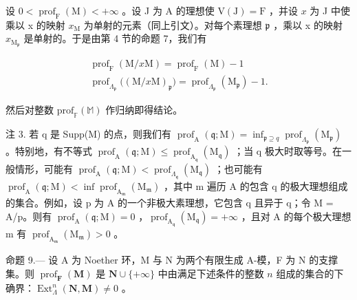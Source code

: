 设 \(0 < \operatorname{prof}_{\mathrm{F}}(\mathrm{M}) < +\infty\) 。设 J 为 A 的理想使 \(\mathrm{V}(\mathrm{J}) = \mathrm{F}\) ，并设 \(x\) 为 J 中使乘以 x 的映射 \(x_{\mathrm{M}}\) 为单射的元素（同上引文）。对每个素理想 \(\mathfrak{p}\) ，乘以 x 的映射 \(x_{\mathrm{M}_{\mathfrak{p}}}\) 是单射的。于是由第 4 节的命题 7，我们有

\[
\begin{array}{c} \operatorname{prof} _ {\mathrm{F}} (\mathrm{M} / x \mathrm{M}) = \operatorname{prof} _ {\mathrm{F}} (\mathrm{M}) - 1 \\ \operatorname{prof} _ {\Lambda_ {\mathfrak {p}}} \big ((\mathrm{M} / x \mathrm{M}) _ {\mathfrak {p}} \big) = \operatorname{prof} _ {\Lambda_ {\mathfrak {p}}} (\mathrm{M} _ {\mathfrak {p}}) - 1. \end{array}
\]

然后对整数 \(\mathrm{prof}_{\mathbb{F}}(\mathbb{M})\) 作归纳即得结论。

注 3. 若 q 是 Supp(M) 的点，则我们有 \(\operatorname{prof}_{\mathrm{A}}(\mathfrak{q};\mathrm{M}) = \inf_{\mathfrak{p}\supseteq q} \operatorname{prof}_{\Lambda_{\mathfrak{p}}}(\mathrm{M}_{\mathfrak{p}})\) 。特别地，有不等式 \(\operatorname{prof}_{\mathrm{A}}(\mathfrak{q};\mathrm{M}) \leqslant \operatorname{prof}_{\mathrm{A}_{\mathfrak{q}}}(\mathrm{M}_{\mathfrak{q}})\) ；当 q 极大时取等号。在一般情形，可能有 \(\operatorname{prof}_{\mathrm{A}}(\mathfrak{q};\mathrm{M}) < \operatorname{prof}_{\Lambda_{\mathfrak{q}}}(\mathrm{M}_{\mathfrak{q}})\) ；也可能有 \(\operatorname{prof}_{\mathrm{A}}(\mathfrak{q};\mathrm{M}) < \inf \operatorname{prof}_{\mathrm{A}_{\mathfrak{m}}}(\mathrm{M}_{\mathfrak{m}})\) ，其中 m 遍历 A 的包含 q 的极大理想组成的集合。例如，设 p 为 A 的一个非极大素理想，它包含 q 且异于 q；令 M = A/p。则有 \(\operatorname{prof}_{\mathrm{A}}(\mathfrak{q};\mathrm{M}) = 0\) ，\(\operatorname{prof}_{\mathrm{A}_{\mathfrak{q}}}(\mathrm{M}_{\mathfrak{q}}) = +\infty\) ，且对 A 的每个极大理想 m 有 \(\operatorname{prof}_{\mathrm{A}_{\mathfrak{m}}}(\mathrm{M}_{\mathfrak{m}}) > 0\) 。

命题 9.--- 设 A 为 Noether 环，M 与 N 为两个有限生成 A-模，F 为 N 的支撑集。则 \(\operatorname{prof}_{\mathbf{F}}(\mathbf{M})\) 是 \(\mathbf{N} \cup \{+\infty\}\) 中由满足下述条件的整数 \(n\) 组成的集合的下确界：\(\operatorname{Ext}_{\Lambda}^{n}(\mathbf{N}, \mathbf{M}) \neq 0\) 。

